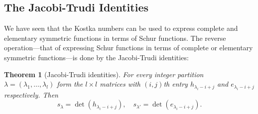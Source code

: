 \documentclass[11pt]{amsart}
\newtheorem{theorem}{Theorem}[subsection]
\theoremstyle{definition}
\theoremstyle{example}
\begin{document}
\subsection{The Jacobi-Trudi Identities}
\label{sec:jacobi-trudi-ident}
We have seen that the Kostka numbers can be used to express complete and elementary symmetric functions in terms of Schur functions.
The reverse operation---that of expressing Schur functions in terms of complete or elementary symmetric functions---is done by the Jacobi-Trudi identities:
\begin{theorem}
  [Jacobi-Trudi identities]
  For every integer partition $\lambda=(\lambda_1,\dotsc,\lambda_l)$ form the $l\times l$ matrices with $(i,j)$th entry $h_{\lambda_i-i+j}$ and $e_{\lambda_i-i+j}$ respectively.
  Then
  \begin{displaymath}
    s_\lambda = \det(h_{\lambda_i-i+j}), \quad s_{\lambda'} = \det(e_{\lambda_i-i+j}).
  \end{displaymath}
\end{theorem}
\end{document}
